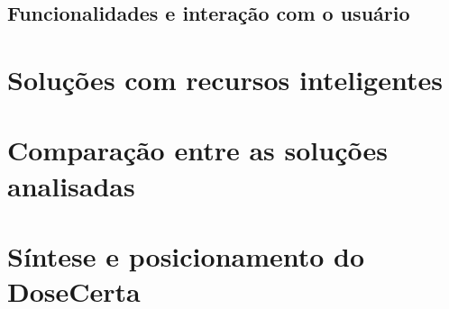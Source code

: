 
\subsection{Funcionalidades e interação com o usuário}
\label{subsec:funcionalidades_aplicativos}


\section{Soluções com recursos inteligentes}
\label{sec:solucoes_inteligentes}


\section{Comparação entre as soluções analisadas}
\label{sec:comparacao_solucoes}


%

\section{Síntese e posicionamento do DoseCerta}
\label{sec:sintese_estado_arte}

